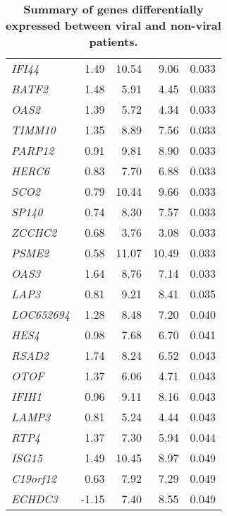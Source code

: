 \begin{center}
\begin{table}[htbp]
\begin{tabular}{@{} l r r r r}
\textit{IFI44}       & 1.49                      & 10.54    & 9.06         & 0.033        \\
\textit{BATF2}       & 1.48                      & 5.91     & 4.45         & 0.033        \\
\textit{OAS2}        & 1.39                      & 5.72     & 4.34         & 0.033        \\
\textit{TIMM10}      & 1.35                      & 8.89     & 7.56         & 0.033        \\
\textit{PARP12}      & 0.91                      & 9.81     & 8.90         & 0.033        \\
\textit{HERC6}       & 0.83                      & 7.70     & 6.88         & 0.033        \\
\textit{SCO2}        & 0.79                      & 10.44    & 9.66         & 0.033        \\
\textit{SP140}       & 0.74                      & 8.30     & 7.57         & 0.033        \\
\textit{ZCCHC2}      & 0.68                      & 3.76     & 3.08         & 0.033        \\
\textit{PSME2}       & 0.58                      & 11.07    & 10.49        & 0.033        \\
\textit{OAS3}        & 1.64                      & 8.76     & 7.14         & 0.033        \\
\textit{LAP3}        & 0.81                      & 9.21     & 8.41         & 0.035        \\
\textit{LOC652694}   & 1.28                      & 8.48     & 7.20         & 0.040        \\
\textit{HES4}        & 0.98                      & 7.68     & 6.70         & 0.041        \\
\textit{RSAD2}       & 1.74                      & 8.24     & 6.52         & 0.043        \\
\textit{OTOF}        & 1.37                      & 6.06     & 4.71         & 0.043        \\
\textit{IFIH1}       & 0.96                      & 9.11     & 8.16         & 0.043        \\
\textit{LAMP3}       & 0.81                      & 5.24     & 4.44         & 0.043        \\
\textit{RTP4}        & 1.37                      & 7.30     & 5.94         & 0.044        \\
\textit{ISG15}       & 1.49                      & 10.45    & 8.97         & 0.049        \\
\textit{C19orf12}    & 0.63                      & 7.92     & 7.29         & 0.049        \\
\textit{ECHDC3}      & -1.15                     & 7.40     & 8.55         & 0.049       \\
\bottomrule
\end{tabular}
\medskip
\caption[Differentially expressed genes for viral infections]{\textbf{Summary of genes differentially expressed between viral and non-viral patients.}}
\label{tab:ViralDE}
\end{table}
\bigskip


\end{center}
